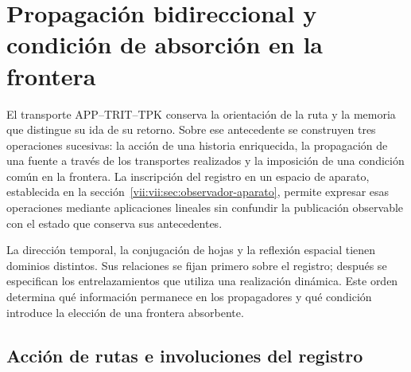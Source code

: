 
\section{Propagación bidireccional y condición de absorción en la frontera}
\label{vii:vii:sec:propagacion-bidireccional}

El transporte APP--TRIT--TPK conserva la orientación de la ruta y la memoria
que distingue su ida de su retorno. Sobre ese antecedente se construyen tres
operaciones sucesivas: la acción de una historia enriquecida, la propagación
de una fuente a través de los transportes realizados y la imposición de una
condición común en la frontera. La inscripción del registro en un espacio de
aparato, establecida en la sección~\ref{vii:vii:sec:observador-aparato}, permite
expresar esas operaciones mediante aplicaciones lineales sin confundir la
publicación observable con el estado que conserva sus antecedentes.

La dirección temporal, la conjugación de hojas y la reflexión espacial
tienen dominios distintos. Sus relaciones se fijan primero sobre el registro;
después se especifican los entrelazamientos que utiliza una realización
dinámica. Este orden determina qué información permanece en los propagadores
y qué condición introduce la elección de una frontera absorbente.

\subsection{Acción de rutas e involuciones del registro}
\label{vii:vii:subsec:accion-bidireccional}

